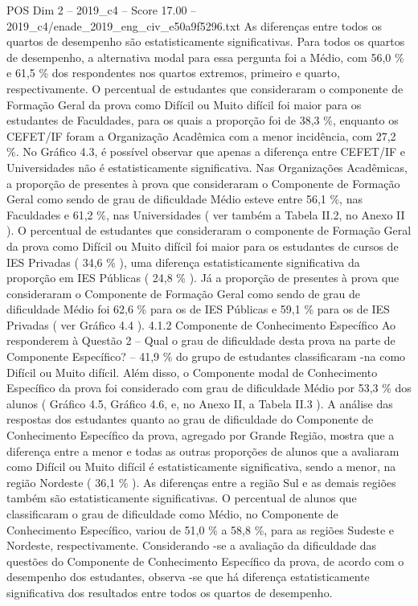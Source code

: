 \begin{textsample}{POS Dim 2 – 2019\_c4 – Score 17.00 – 2019\_c4/enade\_2019\_eng\_civ\_e50a9f5296.txt}
As diferenças entre todos os quartos de desempenho são estatisticamente significativas.
Para todos os quartos de desempenho, a alternativa modal para essa pergunta foi a Médio, com 56,0 \% e 61,5 \% dos respondentes nos quartos extremos, primeiro e quarto, respectivamente.
O percentual de estudantes que consideraram o componente de Formação Geral da prova como Difícil ou Muito difícil foi maior para os estudantes de Faculdades, para os quais a proporção foi de 38,3 \%, enquanto os CEFET/IF foram a Organização Acadêmica com a menor incidência, com 27,2 \%.
No Gráfico 4.3, é possível observar que apenas a diferença entre CEFET/IF e Universidades não é estatisticamente significativa.
Nas Organizações Acadêmicas, a proporção de presentes à prova que consideraram o Componente de Formação Geral como sendo de grau de dificuldade Médio esteve entre 56,1 \%, nas Faculdades e 61,2 \%, nas Universidades ( ver também a Tabela II.2, no Anexo II ).
O percentual de estudantes que consideraram o componente de Formação Geral da prova como Difícil ou Muito difícil foi maior para os estudantes de cursos de IES Privadas ( 34,6 \% ), uma diferença estatisticamente significativa da proporção em IES Públicas ( 24,8 \% ).
Já a proporção de presentes à prova que consideraram o Componente de Formação Geral como sendo de grau de dificuldade Médio foi 62,6 \% para os de IES Públicas e 59,1 \% para os de IES Privadas ( ver Gráfico 4.4 ). 4.1.2 Componente de Conhecimento Específico Ao responderem à Questão 2 – Qual o grau de dificuldade desta prova na parte de Componente Específico? – 41,9 \% do grupo de estudantes classificaram -na como Difícil ou Muito difícil.
Além disso, o Componente modal de Conhecimento Específico da prova foi considerado com grau de dificuldade Médio por 53,3 \% dos alunos ( Gráfico 4.5, Gráfico 4.6, e, no Anexo II, a Tabela II.3 ).
A análise das respostas dos estudantes quanto ao grau de dificuldade do Componente de Conhecimento Específico da prova, agregado por Grande Região, mostra que a diferença entre a menor e todas as outras proporções de alunos que a avaliaram como Difícil ou Muito difícil é estatisticamente significativa, sendo a menor, na região Nordeste ( 36,1 \% ).
As diferenças entre a região Sul e as demais regiões também são estatisticamente significativas.
O percentual de alunos que classificaram o grau de dificuldade como Médio, no Componente de Conhecimento Específico, variou de 51,0 \% a 58,8 \%, para as regiões Sudeste e Nordeste, respectivamente.
Considerando -se a avaliação da dificuldade das questões do Componente de Conhecimento Específico da prova, de acordo com o desempenho dos estudantes, observa -se que há diferença estatisticamente significativa dos resultados entre todos os quartos de desempenho.

\end{textsample}
